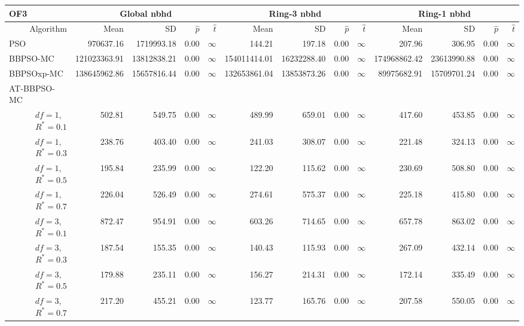 \documentclass[12pt]{article}
\begin{document}
\begin{table}[ht]
\centering
\tiny{
\begin{tabular}{r|rrrr|rrrr|rrrr}
\multicolumn{1}{l}{OF3} & \multicolumn{4}{c}{Global nbhd} & \multicolumn{4}{c}{Ring-3 nbhd} & \multicolumn{4}{c}{Ring-1 nbhd}\\
  \hline
Algorithm & Mean & SD & $\widehat{p}$ & $\widehat{t}$ & Mean & SD & $\widehat{p}$ & $\widehat{t}$ & Mean & SD & $\widehat{p}$ & $\widehat{t}$ \\ 
  \hline
\multicolumn{1}{l|}{PSO} & 970637.16 & 1719993.18 & 0.00 & $\infty$ & 144.21 & 197.18 & 0.00 & $\infty$ & 207.96 & 306.95 & 0.00 & $\infty$ \\ 
  \multicolumn{1}{l|}{BBPSO-MC} & 121023363.91 & 13812838.21 & 0.00 & $\infty$ & 154011414.01 & 16232288.40 & 0.00 & $\infty$ & 174968862.42 & 23613990.88 & 0.00 & $\infty$ \\ 
  \multicolumn{1}{l|}{BBPSOxp-MC} & 138645962.86 & 15657816.44 & 0.00 & $\infty$ & 132653861.04 & 13853873.26 & 0.00 & $\infty$ & 89975682.91 & 15709701.24 & 0.00 & $\infty$ \\ 
\hline
\multicolumn{1}{l|}{AT-BBPSO-MC} &&&&&&&&&&&&\\
  $df = 1,\enspace$ $R^* =0.1$ & 502.81 & 549.75 & 0.00 & $\infty$ & 489.99 & 659.01 & 0.00 & $\infty$ & 417.60 & 453.85 & 0.00 & $\infty$ \\ 
  $df = 1,\enspace$ $R^* =0.3$ & 238.76 & 403.40 & 0.00 & $\infty$ & 241.03 & 308.07 & 0.00 & $\infty$ & 221.48 & 324.13 & 0.00 & $\infty$ \\ 
  $df = 1,\enspace$ $R^* =0.5$ & 195.84 & 235.99 & 0.00 & $\infty$ & 122.20 & 115.62 & 0.00 & $\infty$ & 230.69 & 508.80 & 0.00 & $\infty$ \\ 
  $df = 1,\enspace$ $R^* =0.7$ & 226.04 & 526.49 & 0.00 & $\infty$ & 274.61 & 575.37 & 0.00 & $\infty$ & 225.18 & 415.80 & 0.00 & $\infty$ \\ 
  $df = 3,\enspace$ $R^* =0.1$ & 872.47 & 954.91 & 0.00 & $\infty$ & 603.26 & 714.65 & 0.00 & $\infty$ & 657.78 & 863.02 & 0.00 & $\infty$ \\ 
  $df = 3,\enspace$ $R^* =0.3$ & 187.54 & 155.35 & 0.00 & $\infty$ & 140.43 & 115.93 & 0.00 & $\infty$ & 267.09 & 432.14 & 0.00 & $\infty$ \\ 
  $df = 3,\enspace$ $R^* =0.5$ & 179.88 & 235.11 & 0.00 & $\infty$ & 156.27 & 214.31 & 0.00 & $\infty$ & 172.14 & 335.49 & 0.00 & $\infty$ \\ 
  $df = 3,\enspace$ $R^* =0.7$ & 217.20 & 455.21 & 0.00 & $\infty$ & 123.77 & 165.76 & 0.00 & $\infty$ & 207.58 & 550.05 & 0.00 & $\infty$ \\ 

\end{tabular}}
\end{table}
\end{document}
